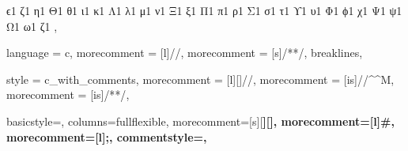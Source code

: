 {{	            {ϵ}{{\textepsilon}}1%
	            {ζ}{{\textzeta}}1%
	            {η}{{\texteta}}1%
	            {Θ}{{\textTheta}}1
	            {θ}{{\texttheta}}1%
	            {ι}{{\textiota}}1%
	            {κ}{{\textkappa}}1%
	            {Λ}{{\textLambda}}1
	            {λ}{{\textlambda}}1%
	            {μ}{{\textmu}}1%
	            {ν}{{\textnu}}1%
	            {Ξ}{{\textXi}}1
	            {ξ}{{\textxi}}1%
	            {Π}{{\textPi}}1
	            {π}{{\textpi}}1%
	            {ρ}{{\textrho}}1%
	            {Σ}{{\textSigma}}1
	            {σ}{{\textsigma}}1%
	            {τ}{{\texttau}}1%
	            {ϒ}{{\textUpsilon}}1
	            {υ}{{\textupsilon}}1%
	            {Φ}{{\textPhi}}1
	            {ϕ}{{\textphi}}1%
	            {χ}{{\textchi}}1%
	            {Ψ}{{\textPsi}}1
	            {ψ}{{\textpsi}}1%
	            {Ω}{{\textOmega}}1
	            {ω}{{\textomega}}1%
	            {ζ}{{\varsigma}}1%
	         },
}

%
{
	language     = c,
	morecomment  = [l]{//},
	morecomment  = [s]{/*}{*/},
	breaklines,
}

%
{
	style        = c_with_comments,
	morecomment  = [l][\nullfont]{//},
	morecomment  = [is]{//}{\^^M},
	morecomment  = [is]{/*}{*/},
}

{
	basicstyle=\ttfamily\small,
	columns=fullflexible,
	morecomment=[s][\color{Orchid}\bfseries]{[}{]},
	morecomment=[l]{\#},
	morecomment=[l]{;},
	commentstyle=\color{gray}\ttfamily,
}





